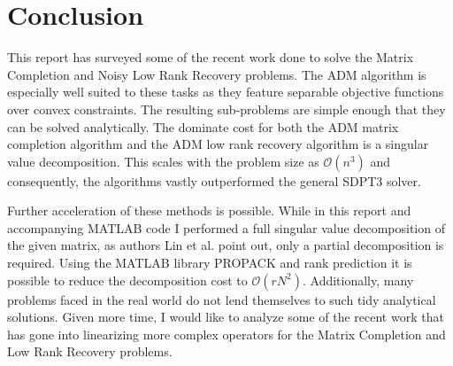 \documentclass{article}
\begin{document}
\section{Conclusion}
This report has surveyed some of the recent work done to solve the Matrix Completion and Noisy Low Rank Recovery problems.  The ADM algorithm is especially well suited to these tasks as they feature separable objective functions over convex constraints.  The resulting sub-problems are simple enough that they can be solved analytically.  The dominate cost for both the ADM matrix completion algorithm and the ADM low rank recovery algorithm is a singular value decomposition.  This scales with the problem size as $\mathcal{O}(n^3)$ and consequently, the algorithms vastly outperformed the general SDPT3 solver.  

Further acceleration of these methods is possible.  While in this report and accompanying MATLAB code I performed a full singular value decomposition of the given matrix, as authors Lin et al. point out, only a partial decomposition is required.  Using the MATLAB library PROPACK and rank prediction it is possible to reduce the decomposition cost to $\mathcal{O}(rN^2)$.  Additionally, many problems faced in the real world do not lend themselves to such tidy analytical solutions.  Given more time, I would like to analyze some of the recent work that has gone into linearizing more complex operators for the Matrix Completion and Low Rank Recovery problems.
\end{document}
